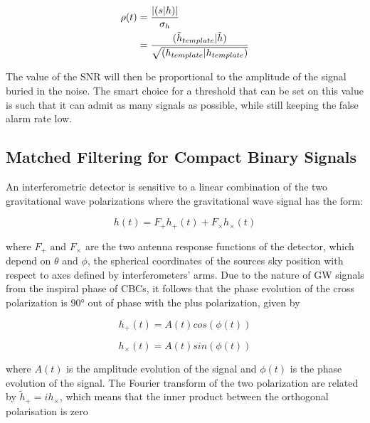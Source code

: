 \documentclass[binding=0.6cm, LaM]{sapthesis}
\begin{document}
                \begin{align}
                        \rho(t) &= {{| (s|h) |} \over {\sigma_{h}}} \\
                             &= {{(\tilde h_{template}|\tilde h)} \over {\sqrt{(h_{template}|h_{template})}}}
                \end{align}

        The value of the SNR will then be proportional to the amplitude of the signal buried in the noise.
	The smart choice for a threshold that can be set on this value is such that
	it can admit as many signals as possible, while still keeping the false alarm rate low. 

\subsection{Matched Filtering for Compact Binary Signals}

	An interferometric detector is sensitive to a linear combination 
	of the two gravitational wave polarizations where the gravitational wave signal has the form: 

                \begin{equation}
                h(t) = F_{+}h_{+} (t) + F_{\times}h_{\times}(t)
                \end{equation}

	where $F_{+}$ and $F_{\times}$ are the two antenna response functions of the detector, 
	which depend on $\theta$ and $\phi$, 
	the spherical coordinates of the sources sky position with respect to axes defined by interferometers’ arms. 
	Due to the nature of GW signals from the inspiral phase of CBCs, 
	it follows that the phase evolution of the cross polarization is $\ang{90}$ out of phase with the plus polarization, given by 

		\begin{equation}
			h_{+}(t) = A(t) cos (\phi (t))
		\end{equation}

		\begin{equation}
			h_{\times}(t) = A(t) sin (\phi (t))  
		\end{equation}
	
	where $A(t)$ is the amplitude evolution of the signal 
	and $\phi(t)$ is the phase evolution of the signal. 
	The Fourier transform of the two polarization are related by $\tilde h_{+} = ih_{\times}$, 
	which means that the inner product between the orthogonal polarisation is zero 
\end{document}
